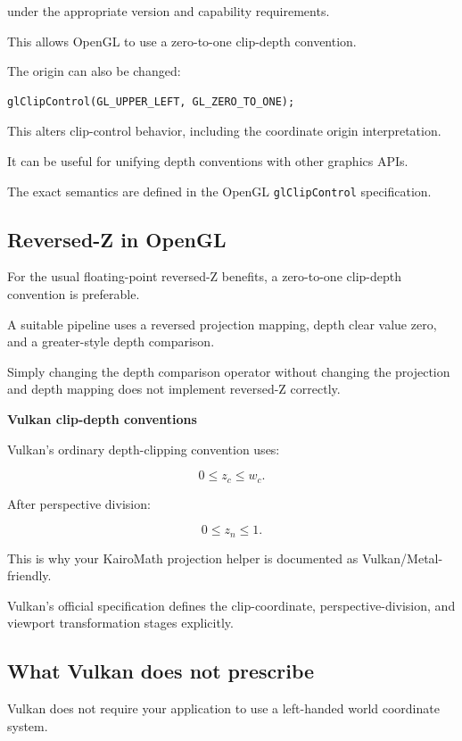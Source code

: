 under the appropriate version and capability requirements.

This allows OpenGL to use a zero-to-one clip-depth convention.

The origin can also be changed:

\begin{verbatim}
glClipControl(GL_UPPER_LEFT, GL_ZERO_TO_ONE);
\end{verbatim}

This alters clip-control behavior, including the coordinate origin interpretation.

It can be useful for unifying depth conventions with other graphics APIs.

The exact semantics are defined in the OpenGL \texttt{glClipControl} specification. 

\subsection{Reversed-Z in OpenGL}\label{02-foundations-ii-ch033-reversed-z-in-opengl}

For the usual floating-point reversed-Z benefits, a zero-to-one clip-depth convention is preferable.

A suitable pipeline uses a reversed projection mapping, depth clear value zero, and a greater-style depth comparison.

Simply changing the depth comparison operator without changing the projection and depth mapping does not implement reversed-Z correctly.

\textbf{Vulkan clip-depth conventions}

Vulkan's ordinary depth-clipping convention uses:

\[
 \boxed{ 0\le z_c\le w_c }.
\]

After perspective division:

\[
 \boxed{ 0\le z_n\le1 }.
\]

This is why your KairoMath projection helper is documented as Vulkan/Metal-friendly.

Vulkan's official specification defines the clip-coordinate, perspective-division, and viewport transformation stages explicitly. 

\subsection{What Vulkan does not prescribe}\label{02-foundations-ii-ch033-what-vulkan-does-not-prescribe}

Vulkan does not require your application to use a left-handed world coordinate system.

